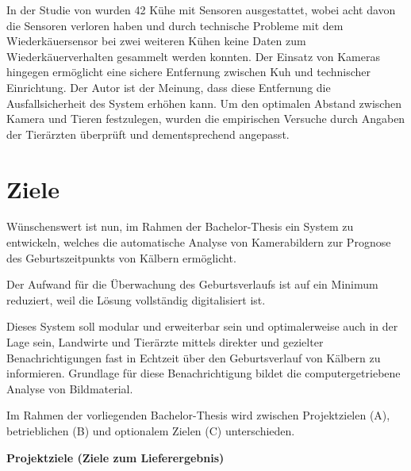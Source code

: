 In der Studie von \cite[S. 6]{Ouellet2016} wurden 42 Kühe mit Sensoren ausgestattet, wobei acht davon die Sensoren verloren haben und durch technische Probleme mit dem Wiederkäuersensor bei zwei weiteren Kühen keine Daten zum Wiederkäuerverhalten gesammelt werden konnten. Der Einsatz von Kameras hingegen ermöglicht eine sichere Entfernung zwischen Kuh und technischer Einrichtung. Der Autor ist der Meinung, dass diese Entfernung die Ausfallsicherheit des System erhöhen kann. Um den optimalen Abstand zwischen Kamera und Tieren festzulegen, wurden die empirischen Versuche durch Angaben der Tierärzten überprüft und dementsprechend angepasst.
 
\section{Ziele }

Wünschenswert ist nun, im Rahmen der Bachelor-Thesis ein System zu entwickeln, welches die automatische Analyse von Kamerabildern zur Prognose des Geburtszeitpunkts von Kälbern ermöglicht.

Der Aufwand für die Überwachung des Geburtsverlaufs ist auf ein Minimum reduziert, weil die Lösung vollständig digitalisiert ist.

Dieses System soll modular und erweiterbar sein und optimalerweise auch in der Lage sein, Landwirte und Tierärzte mittels direkter und gezielter Benachrichtigungen fast in Echtzeit über den Geburtsverlauf von Kälbern zu informieren. Grundlage für diese Benachrichtigung bildet die computergetriebene Analyse von Bildmaterial.

Im Rahmen der vorliegenden Bachelor-Thesis wird zwischen Projektzielen (A), betrieblichen (B) und optionalem Zielen (C) unterschieden.


\textbf{Projektziele (Ziele zum Lieferergebnis)}

